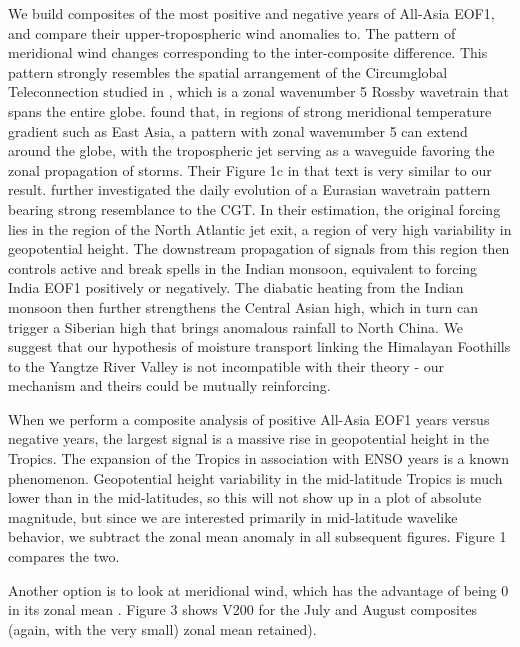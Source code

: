 	We build composites of the most positive and negative years of All-Asia EOF1, and compare their upper-tropospheric wind anomalies to. The pattern of meridional wind changes corresponding to the inter-composite difference. This pattern strongly resembles the spatial arrangement of the Circumglobal Teleconnection studied in \citet{Ding2005a}, which is a zonal wavenumber 5 Rossby wavetrain that spans the entire globe. \citet{Branstator2002} found that, in regions of strong meridional temperature gradient such as East Asia, a pattern with zonal wavenumber 5 can extend around the globe, with the tropospheric jet serving as a waveguide favoring the zonal propagation of storms. Their Figure 1c in that text is very similar to our result. \citet{Ding2007} further investigated the daily evolution of a Eurasian wavetrain pattern bearing strong resemblance to the CGT. In their estimation, the original forcing lies in the region of the North Atlantic jet exit, a region of very high variability in geopotential height. The downstream propagation of signals from this region then controls active and break spells in the Indian monsoon, equivalent to forcing India EOF1 positively or negatively. The diabatic heating from the Indian monsoon then further strengthens the Central Asian high, which in turn can trigger a Siberian high that brings anomalous rainfall to North China. We suggest that our hypothesis of moisture transport linking the Himalayan Foothills to the Yangtze River Valley \citep{Day2015} is not incompatible with their theory - our mechanism and theirs could be mutually reinforcing.
	
	When we perform a composite analysis of positive All-Asia EOF1 years versus negative years, the largest signal is a massive rise in geopotential height in the Tropics. The expansion of the Tropics in association with ENSO years is a known phenomenon.  Geopotential height variability in the mid-latitude Tropics is much lower than in the mid-latitudes, so this will not show up in a plot of absolute magnitude, but since we are interested primarily in mid-latitude wavelike behavior, we subtract the zonal mean anomaly in all subsequent figures. Figure 1 compares the two. 
	
	Another option is to look at meridional wind, which has the advantage of being 0 in its zonal mean \citep{Ding2007}. Figure 3 shows V200 for the July and August composites (again, with the very small) zonal mean retained).
	
